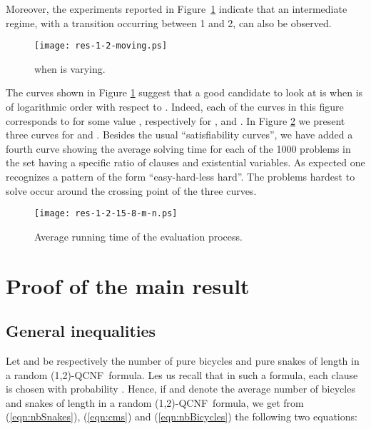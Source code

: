 \documentclass[aop,noinfoline]{imsart}
\newcommand{\onetwo}{(1,2)}
\newcommand{\onetwoqcnf}{\mbox{\sf \onetwo-QCNF}}
\begin{document}
Moreover, the
experiments reported in Figure~\ref{fig:curves-moving} indicate
that an intermediate regime, with a transition occurring 
between 1 and 2, can also be observed.




\begin{figure}[th]
  \centering
  \texttt{[image: res-1-2-moving.ps]}
  \caption{ when  is varying.}
  \label{fig:curves-moving}
\end{figure}




The curves
shown in Figure \ref{fig:curves-moving} suggest that a good
candidate to look at is when  is of logarithmic order with
respect to . Indeed, each of the curves in this figure
corresponds to  for some value
, respectively for ,  and . In
Figure \ref{fig:running-time} we present three curves for
 and . Besides the usual
``satisfiability curves'', we have added a fourth curve showing the
average solving time for each of the 1000 problems in the set
having a specific ratio of clauses and existential variables. As
expected one recognizes a pattern of the form ``easy-hard-less
hard''. The problems hardest to solve occur around the crossing
point of the three curves.



\begin{figure}[th]
  \centering
 \texttt{[image: res-1-2-15-8-m-n.ps]}
  \caption{Average running time of the evaluation process.}
  \label{fig:running-time}
\end{figure}
\medskip

\fi


\section{Proof of the main result} \label{sec:main}

\subsection{General inequalities}
Let  and  be respectively the
number of pure bicycles and pure snakes of length    in a random
\onetwoqcnf  \ formula.     Les us recall that in such a formula, each
clause is chosen with probability . Hence, if   and 
denote   the average number of  bicycles and snakes of length  in
a random \onetwoqcnf  \ formula,    we get from (\ref{eqn:nbSnakes}),
(\ref{eqn:cms}) and (\ref{eqn:nbBicycles}) the following two equations:
    
\end{document}
